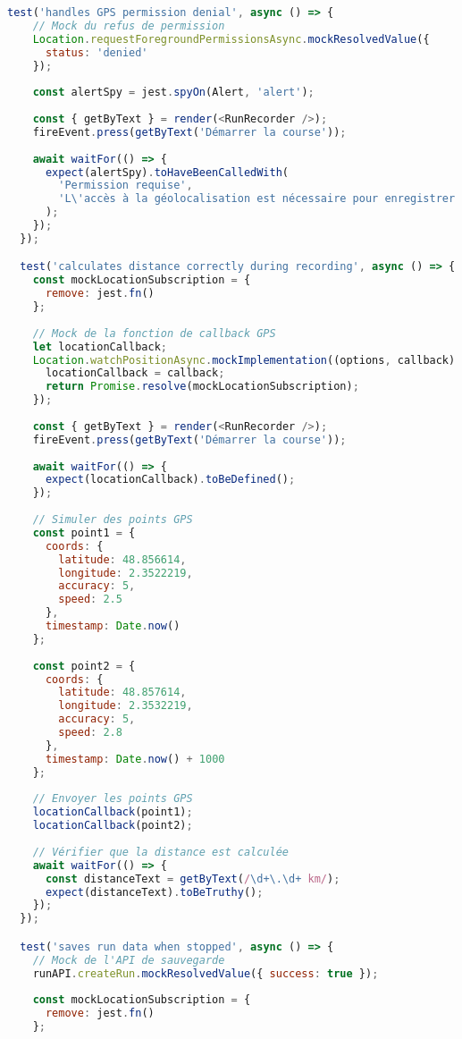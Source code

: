 \begin{lstlisting}[language=javascript, caption=Tests React Native avec Jest et React Native Testing Library]
  test('handles GPS permission denial', async () => {
    // Mock du refus de permission
    Location.requestForegroundPermissionsAsync.mockResolvedValue({
      status: 'denied'
    });
    
    const alertSpy = jest.spyOn(Alert, 'alert');
    
    const { getByText } = render(<RunRecorder />);
    fireEvent.press(getByText('Démarrer la course'));
    
    await waitFor(() => {
      expect(alertSpy).toHaveBeenCalledWith(
        'Permission requise',
        'L\'accès à la géolocalisation est nécessaire pour enregistrer vos courses.'
      );
    });
  });

  test('calculates distance correctly during recording', async () => {
    const mockLocationSubscription = {
      remove: jest.fn()
    };
    
    // Mock de la fonction de callback GPS
    let locationCallback;
    Location.watchPositionAsync.mockImplementation((options, callback) => {
      locationCallback = callback;
      return Promise.resolve(mockLocationSubscription);
    });
    
    const { getByText } = render(<RunRecorder />);
    fireEvent.press(getByText('Démarrer la course'));
    
    await waitFor(() => {
      expect(locationCallback).toBeDefined();
    });
    
    // Simuler des points GPS
    const point1 = {
      coords: {
        latitude: 48.856614,
        longitude: 2.3522219,
        accuracy: 5,
        speed: 2.5
      },
      timestamp: Date.now()
    };
    
    const point2 = {
      coords: {
        latitude: 48.857614,
        longitude: 2.3532219,
        accuracy: 5,
        speed: 2.8
      },
      timestamp: Date.now() + 1000
    };
    
    // Envoyer les points GPS
    locationCallback(point1);
    locationCallback(point2);
    
    // Vérifier que la distance est calculée
    await waitFor(() => {
      const distanceText = getByText(/\d+\.\d+ km/);
      expect(distanceText).toBeTruthy();
    });
  });

  test('saves run data when stopped', async () => {
    // Mock de l'API de sauvegarde
    runAPI.createRun.mockResolvedValue({ success: true });
    
    const mockLocationSubscription = {
      remove: jest.fn()
    };
    

\end{lstlisting}
